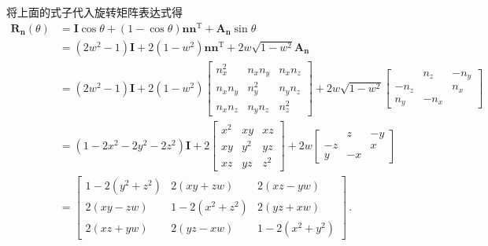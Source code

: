 \begin{prove}
    将上面的式子代入旋转矩阵表达式得
    \begin{align}
        \bm R_{\bm n}(\theta) & =\bm I\cos\theta+(1-\cos\theta)\bm n\bm n^\mathrm{T}+\bm A_{\bm n}\sin\theta\nonumber                                         \\
                              & =(2w^2-1)\bm I+2(1-w^2)\bm n\bm n^\mathrm{T}+2w\sqrt{1-w^2}\bm A_{\bm n}\nonumber                                             \\
                              & =(2w^2-1)\bm I+2(1-w^2)\left[\begin{array}{ccc}
                n_x^2  & n_xn_y & n_xn_z \\
                n_xn_y & n_y^2  & n_yn_z \\
                n_xn_z & n_yn_z & n_z^2
            \end{array}\right]+2w\sqrt{1-w^2}\left[\begin{array}{ccc}
                     & n_z  & -n_y \\
                -n_z &      & n_x  \\
                n_y  & -n_x &
            \end{array}\right]\nonumber \\
                              & =(1-2x^2-2y^2-2z^2)\bm I+2\left[\begin{array}{ccc}
                x^2 & xy  & xz  \\
                xy  & y^2 & yz  \\
                xz  & yz  & z^2
            \end{array}\right]+2w\left[\begin{array}{ccc}
                   & z  & -y \\
                -z &    & x  \\
                y  & -x &
            \end{array}\right]\nonumber          \\
                              & =\left[\begin{array}{ccc}
                1-2(y^2+z^2) & 2(xy+zw)     & 2(xz-yw)     \\
                2(xy-zw)     & 1-2(x^2+z^2) & 2(yz+xw)     \\
                2(xz+yw)     & 2(yz-xw)     & 1-2(x^2+y^2)
            \end{array}\right]\, .
    \end{align}
\end{prove}

